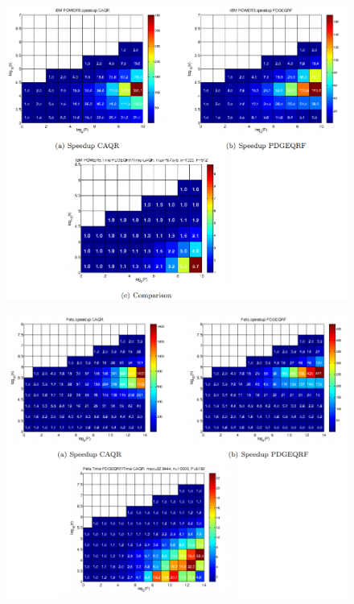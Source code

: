\documentclass{article}
\begin{document}
\begin{figure}[htbp]
	\centering
	\includegraphics[scale=.6]{CAQR_res1.png}
\end{figure}
\begin{figure}[htbp]
	\centering
	\includegraphics[scale=.6]{CAQR_res2.png}
\end{figure}
\end{document}
